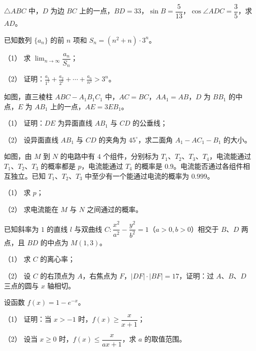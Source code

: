 \begin{question}
$\triangle ABC$ 中，$D$ 为边 $BC$ 上的一点，$BD=33$，$\sin B=\dfrac5{13}$，$\cos\angle ADC=\dfrac35$，求 $AD$。

\end{question}
\begin{question}
已知数列 $\{a_n\}$ 的前 $n$ 项和 $S_n=(n^2+n)\cdot3^n$。

（1） 求 $\displaystyle\lim_{n\to\infty}\dfrac{a_n}{S_n}$；

（2） 证明：$\displaystyle\frac{a_1}{1^2}+\frac{a_2}{2^2}+\cdots+\frac{a_n}{n^2}>3^n$。

\Needspace{0.4\textheight}
\end{question}
\begin{question}
如图，直三棱柱 $ABC-A_1B_1C_1$ 中，$AC=BC$，$AA_1=AB$，$D$ 为 $BB_1$ 的中点，$E$ 为 $AB_1$ 上的一点，$AE=3EB_1$。
\nopagebreak[4]
\begin{center}\end{center}
\nopagebreak[4]
（1） 证明：$DE$ 为异面直线 $AB_1$ 与 $CD$ 的公垂线；

（2） 设异面直线 $AB_1$ 与 $CD$ 的夹角为 $45^\circ$，求二面角 $A_1-AC_1-B_1$ 的大小。

\Needspace{0.4\textheight}
\end{question}
\begin{question}
如图，由 $M$ 到 $N$ 的电路中有 $4$ 个组件，分别标为 $T_1\text{、}T_2\text{、}T_3\text{、}T_4$，电流能通过 $T_1\text{、}T_2\text{、}T_3$ 的概率都是 $p$，电流能通过 $T_4$ 的概率是 $0.9$。电流能否通过各组件相互独立。已知 $T_1\text{、}T_2\text{、}T_3$ 中至少有一个能通过电流的概率为 $0.999$。
\nopagebreak[4]
\begin{center}\end{center}
\nopagebreak[4]
（1） 求 $p$；

（2） 求电流能在 $M$ 与 $N$ 之间通过的概率。

\end{question}
\begin{question}
已知斜率为 $1$ 的直线 $l$ 与双曲线 $C:\dfrac{x^2}{a^2}-\dfrac{y^2}{b^2}=1$（$a>0,b>0$）相交于 $B\text{、}D$ 两点，且 $BD$ 的中点为 $M(1,3)$。

（1） 求 $C$ 的离心率；

（2） 设 $C$ 的右顶点为 $A$，右焦点为 $F$，$|DF|\cdot|BF|=17$，证明：过 $A\text{、}B\text{、}D$ 三点的圆与 $x$ 轴相切。

\end{question}
\begin{question}
设函数 $f(x)=1-e^{-x}$。

（1） 证明：当 $x>-1$ 时，$f(x)\geq\dfrac{x}{x+1}$；

（2） 设当 $x\geq0$ 时，$f(x)\leq\dfrac{x}{ax+1}$，求 $a$ 的取值范围。

\end{question}